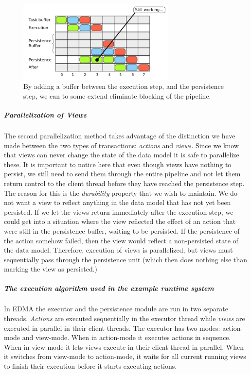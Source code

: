 \begin{figure}
\centering
\includegraphics[width=0.7\textwidth]{img/executionPipelineBetter.png}
\caption{By adding a buffer between the execution step, and the persistence step, we can to some extend eliminate blocking of the pipeline.}
\label{fig:executionPipelineBetter}
\end{figure}


\subparagraph{Parallelization of Views}

The second parallelization method takes advantage of the distinction
we have made between the two types of transactions: \emph{actions}
and \emph{views. }Since we know that views can never change the state
of the data model it is safe to parallelize these. It is important
to notice here that even though views have nothing to persist, we
still need to send them through the entire pipeline and not let them
return control to the client thread before they have reached the persistence
step. The reason for this is the \emph{durability} property that we
wish to maintain. We do not want a view to reflect anything in the
data model that has not yet been persisted. If we let the views return
immediately after the execution step, we could get into a situation
where the view reflected the effect of an action that were still in
the persistence buffer, waiting to be persisted. If the persistence
of the action somehow failed, then the view would reflect a non-persisted
state of the data model. Therefore, execution of views is parallelized,
but views must sequentially pass through the persistence unit (which
then does nothing else than marking the view as persisted.)


\subparagraph{The execution algorithm used in the example runtime system}

In EDMA the executor and the persistence module are run in two separate
threads. \emph{Actions} are executed sequentially in the executor
thread while \emph{views }are executed in parallel in their client
threads. The executor has two modes: action-mode and view-mode. When
in action-mode it executes actions in sequence. When in view mode
it lets views execute in their client thread in parallel. When it
switches from view-mode to action-mode, it waits for all current running
views to finish their execution before it starts executing actions.


